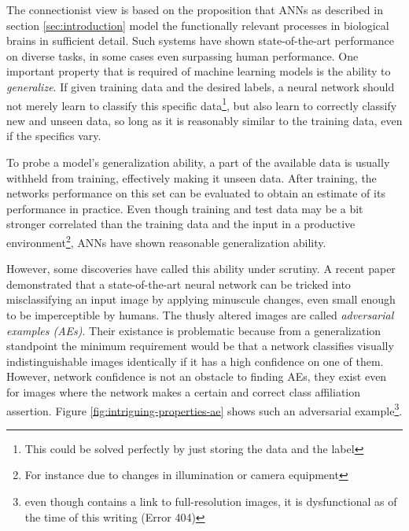 \documentclass[11pt, a4paper]{article}
\begin{document}
The connectionist view is based on the proposition that ANNs as described in section \ref{sec:introduction} model the functionally relevant processes in biological brains in sufficient detail. Such systems have shown state-of-the-art performance on diverse tasks, in some cases even surpassing human performance. One important property that is required of machine learning models is the ability to \emph{generalize}. If given training data and the desired labels, a neural network should not merely learn to classify this specific data\footnote{This could be solved perfectly by just storing the data and the label}, but also learn to correctly classify new and unseen data, so long as it is reasonably similar to the training data, even if the specifics vary.

To probe a model's generalization ability, a part of the available data is usually withheld from training, effectively making it unseen data. After training, the networks performance on this set can be evaluated to obtain an estimate of its performance in practice. Even though training and test data may be a bit stronger correlated than the training data and the input in a productive environment\footnote{For instance due to changes in illumination or camera equipment}, ANNs have shown reasonable generalization ability.

However, some discoveries have called this ability under scrutiny. A recent paper \cite{intriguing-properties-of-neural-networks} demonstrated that a state-of-the-art neural network can be tricked into misclassifying an input image by applying minuscule changes, even small enough to be imperceptible by humans. The thusly altered images are called \emph{adversarial examples (AEs)}. Their existance is problematic because from a generalization standpoint the minimum requirement would be that a network classifies visually indistinguishable images identically if it has a high confidence on one of them. However, network confidence is not an obstacle to finding AEs, they exist even for images where the network makes a certain and correct class affiliation assertion. Figure \ref{fig:intriguing-properties-ae} shows such an adversarial example\footnote{even though \cite{intriguing-properties-of-neural-networks} contains a link to full-resolution images, it is dysfunctional as of the time of this writing (Error 404)}.
\end{document}
